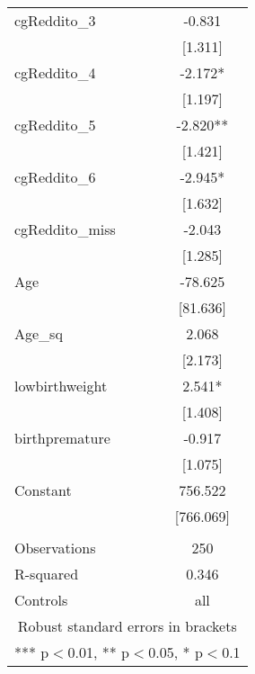 \documentclass[]{article}
\begin{document}
\begin{tabular}{lc}
cgReddito\_3 & -0.831 \\
 & [1.311] \\
cgReddito\_4 & -2.172* \\
 & [1.197] \\
cgReddito\_5 & -2.820** \\
 & [1.421] \\
cgReddito\_6 & -2.945* \\
 & [1.632] \\
cgReddito\_miss & -2.043 \\
 & [1.285] \\
Age & -78.625 \\
 & [81.636] \\
Age\_sq & 2.068 \\
 & [2.173] \\
lowbirthweight & 2.541* \\
 & [1.408] \\
birthpremature & -0.917 \\
 & [1.075] \\
Constant & 756.522 \\
 & [766.069] \\
 &  \\
Observations & 250 \\
R-squared & 0.346 \\
 Controls & all \\ \hline
\multicolumn{2}{c}{ Robust standard errors in brackets} \\
\multicolumn{2}{c}{ *** p$<$0.01, ** p$<$0.05, * p$<$0.1} \\
\end{tabular}
\end{document}
